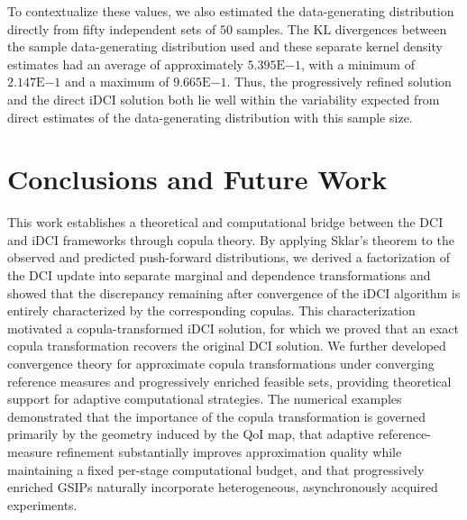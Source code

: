 \documentclass{article}
\newcounter{example}[section]
\newcommand{\expnumber}[2]{{#1}\mathrm{E}{#2}}
\begin{document}
To contextualize these values, we also estimated the data-generating distribution directly from fifty independent sets of $50$ samples.
The KL divergences between the sample data-generating distribution used and these separate kernel density estimates had an average of approximately $\expnumber{5.395}{-1}$, with a minimum of $\expnumber{2.147}{-1}$ and a maximum of $\expnumber{9.665}{-1}$.
Thus, the progressively refined solution and the direct iDCI solution both lie well within the variability expected from direct estimates of the data-generating distribution with this sample size.

\section{Conclusions and Future Work}\label{sec:conclusions}

This work establishes a theoretical and computational bridge between the DCI and iDCI frameworks through copula theory.
By applying Sklar's theorem to the observed and predicted push-forward distributions, we derived a factorization of the DCI update into separate marginal and dependence transformations and showed that the discrepancy remaining after convergence of the iDCI algorithm is entirely characterized by the corresponding copulas.
This characterization motivated a copula-transformed iDCI solution, for which we proved that an exact copula transformation recovers the original DCI solution.
We further developed convergence theory for approximate copula transformations under converging reference measures and progressively enriched feasible sets, providing theoretical support for adaptive computational strategies.
The numerical examples demonstrated that the importance of the copula transformation is governed primarily by the geometry induced by the QoI map, that adaptive reference-measure refinement substantially improves approximation quality while maintaining a fixed per-stage computational budget, and that progressively enriched GSIPs naturally incorporate heterogeneous, asynchronously acquired experiments.
\end{document}
